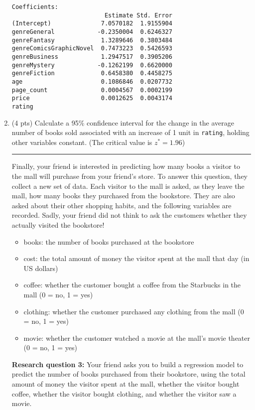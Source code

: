 \documentclass[11pt]{article}
\begin{document}
\begin{enumerate}
\begin{verbatim}
Coefficients:
                          Estimate Std. Error 
(Intercept)              7.0570182  1.9155904
genreGeneral            -0.2350004  0.6246327
genreFantasy             1.3289646  0.3803484
genreComicsGraphicNovel  0.7473223  0.5426593 
genreBusiness            1.2947517  0.3905206
genreMystery            -0.1262199  0.6620000
genreFiction             0.6458380  0.4458275
age                      0.1086846  0.0207732
page_count               0.0004567  0.0002199
price                    0.0012625  0.0043174
rating                  
\end{verbatim}

\vspace{1cm}

\item (4 pts) Calculate a 95\% confidence interval for the change in the average number of books sold associated with an increase of 1 unit in \verb;rating;, holding other variables constant. (The critical value is $z^* = 1.96$)

\newpage

\rule{\textwidth}{1pt}

Finally, your friend is interested in predicting how many books a visitor to the mall will purchase from your friend's store. To answer this question, they collect a new set of data. Each visitor to the mall is asked, as they leave the mall, how many books they purchased from the bookstore. They are also asked about their other shopping habits, and the following variables are recorded. Sadly, your friend did not think to ask the customers whether they actually visited the bookstore!

\begin{itemize}
\item books: the number of books purchased at the bookstore
\item cost: the total amount of money the visitor spent at the mall that day (in US dollars)
\item coffee: whether the customer bought a coffee from the Starbucks in the mall (0 = no, 1 = yes)
\item clothing: whether the customer purchased any clothing from the mall (0 = no, 1 = yes)
\item movie: whether the customer watched a movie at the mall's movie theater (0 = no, 1 = yes) 
\end{itemize}

\textbf{Research question 3:} Your friend asks you to build a regression model to predict the number of books purchased from their bookstore, using the total amount of money the visitor spent at the mall, whether the visitor bought coffee, whether the visitor bought clothing, and whether the visitor saw a movie.


\end{enumerate}
\end{document}
